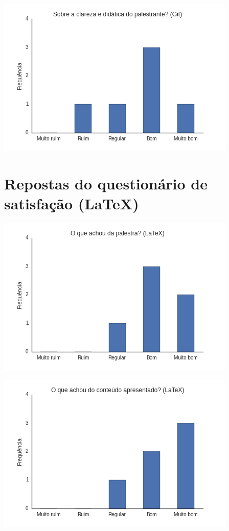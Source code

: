 \documentclass[12pt]{article}
\begin{document}
\begin{center}
    \includegraphics[height=0.25\textheight]{images/python3.png}
\end{center}

\section*{Repostas do questionário de satisfação (LaTeX)}

\begin{center}
    \includegraphics[height=0.25\textheight]{images/latex1.png}
\end{center}

\begin{center}
    \includegraphics[height=0.25\textheight]{images/latex2.png}
\end{center}
\end{document}
